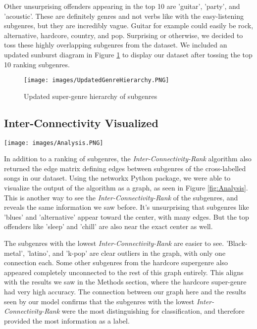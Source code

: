 \documentclass[conference]{IEEEtran}
\begin{document}
Other unsurprising offenders appearing in the top 10 are 'guitar', 'party', and 'acoustic'. These are definitely genres and not verbs like with the easy-listening subgenres, but they are incredibly vague. Guitar for example could easily be rock, alternative, hardcore, country, and pop. Surprising or 
otherwise, we decided to toss these highly overlapping subgenres from the dataset. We included an updated 
sunburst diagram in Figure \ref{fig:UpdatedHierarchy} to display our dataset after tossing the top 10 
ranking subgenres.

\begin{figure}[htbp]
\centerline{\texttt{[image: images/UpdatedGenreHierarchy.PNG]}}
\caption{Updated super-genre hierarchy of subgenres}
\label{fig:UpdatedHierarchy}
\end{figure}

\subsection{Inter-Connectivity Visualized}

\begin{figure*}
  \texttt{[image: images/Analysis.PNG]}
  \caption{True subgenre inter-connectivity structure}
  \label{fig:Analysis}
\end{figure*}

In addition to a ranking of subgenres, the \emph{Inter-Connectivity-Rank} algorithm also returned
the edge matrix defining edges between subgenres of the cross-labelled songs in our dataset. Using the
networkx Python package, we were able to visualize the output of the algorithm as a graph, as seen
in Figure \ref{fig:Analysis}. This is another way to see the \emph{Inter-Connectivity-Rank} of the 
subgenres, and reveals the same information we saw before. It's unsurprising that subgenres like 
'blues' and 'alternative' appear toward the center, with many edges. But the top offenders like
'sleep' and 'chill' are also near the exact center as well. 

The subgenres with the lowest \emph{Inter-Connectivity-Rank} are easier to see. 'Black-metal', 'latino', and 'k-pop' are clear outliers in the graph, with only one connection each. Some other subgenres from the hardcore supergenre also appeared completely unconnected to the rest of this graph entirely. This aligns
with the results we saw in the Methods section, where the hardcore super-genre had very high accuracy.
The connection between our graph here and the results seen by our model confirms that the subgenres with
the lowest \emph{Inter-Connectivity-Rank} were the most distinguishing for classification, and therefore provided the most information as a label. 
\end{document}
